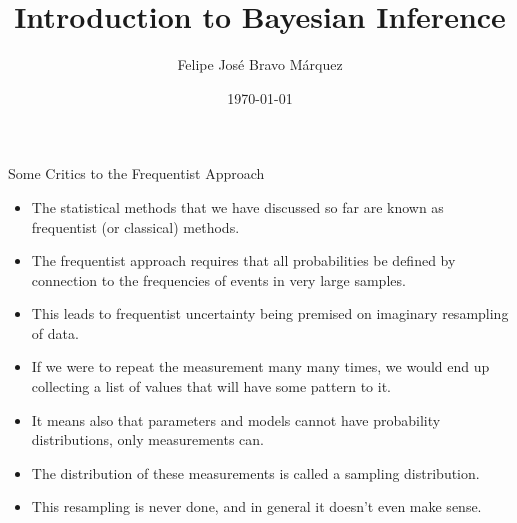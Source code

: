 \documentclass[handout]{beamer}
\title{Introduction to Bayesian Inference}
\author[Felipe Bravo Márquez]{\footnotesize
 \textcolor[rgb]{0.00,0.00,1.00}{Felipe José Bravo Márquez}}
\date{ \today }
\begin{document}
\begin{frame}
\titlepage


\end{frame}




\begin{frame}{Some Critics to the Frequentist Approach}
\scriptsize{
\begin{itemize}
 \item The statistical methods that we have discussed so far are known as frequentist (or classical) methods.
  \item The frequentist approach requires that all probabilities be defined by connection to the frequencies of events in very large samples. 
 \item This leads to frequentist uncertainty being premised on imaginary resampling of data. 
 \item If we were to repeat the measurement many many times, we would end up collecting a list of values that will have some pattern to it. 
 \item  It means also that parameters and models cannot have probability distributions, only measurements can.
 \item The distribution of these measurements is called a sampling distribution. 
 \item This resampling is never done, and in general it doesn't even make sense.
\end{itemize}

} 
\end{frame}
\end{document}
